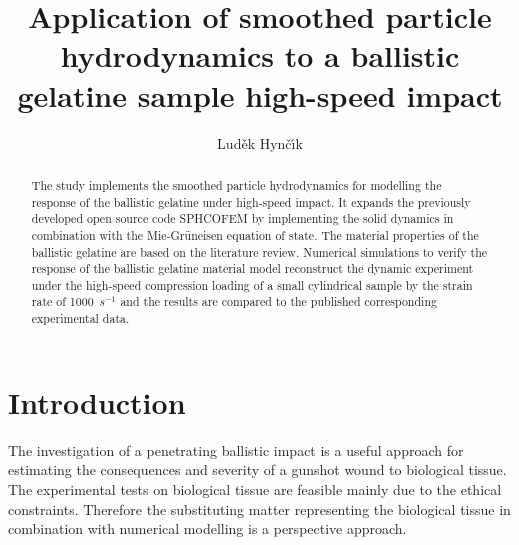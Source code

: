\documentclass{svproc}
\begin{document}
\mainmatter %
%
\title{Application of smoothed particle hydrodynamics to a ballistic gelatine sample high-speed impact}
%
%
\author{Lud\v{e}k Hyn\v{c}\'{\i}k}
%
%
%

\maketitle %

\begin{abstract} %
The study implements the smoothed particle hydrodynamics for modelling the response of the ballistic gelatine under high-speed impact. It expands the previously developed open source code SPHCOFEM by implementing the solid dynamics in combination with the Mie-Gr\"uneisen equation of state. The material properties of the ballistic gelatine are based on the literature review. Numerical simulations to verify the response of the ballistic gelatine material model reconstruct the dynamic experiment under the high-speed compression loading of a small cylindrical sample by the strain rate of 1000~$s^{-1}$ and the results are compared to the published corresponding experimental data. 
%
\end{abstract}
%
\section{Introduction}
%
The investigation of a penetrating ballistic impact is a useful approach for estimating the consequences and severity of a gunshot wound to biological tissue. The experimental tests on biological tissue are feasible mainly due to the ethical constraints. Therefore the substituting matter representing the biological tissue in combination with numerical modelling is a perspective approach. 
\end{document}
